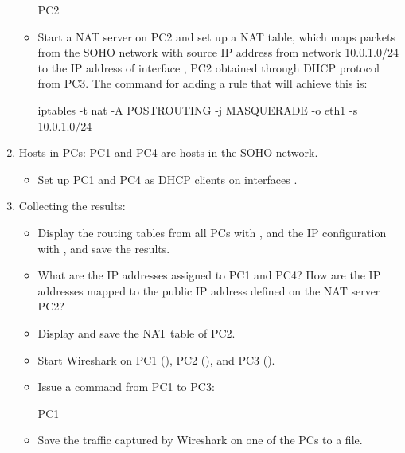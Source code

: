\begin{enumerate}
\begin{itemize}
				\begin{cmdblock}
	PC2%
				\end{cmdblock}
			\item Start a NAT server on PC2 and set up a NAT table, which maps packets from the SOHO network with source IP address from network 10.0.1.0/24 to the IP address of interface , PC2 obtained through DHCP protocol from PC3. The command for adding a rule that will achieve this is:
				\begin{cmdblock}
	iptables -t nat -A POSTROUTING -j MASQUERADE -o eth1 -s 10.0.1.0/24
				\end{cmdblock}
		\end{itemize}
	\item Hosts in PCs: PC1 and PC4 are hosts in the SOHO network.
		\begin{itemize}
			\item Set up PC1 and PC4 as DHCP clients on interfaces .
		\end{itemize}
	\item Collecting the results:
		\begin{itemize}
			\item Display the routing tables from all PCs with , and the IP configuration with , and save the results.
			\item What are the IP addresses assigned to PC1 and PC4? How are the IP addresses mapped to the public IP address defined on the NAT server PC2?
			\item Display and save the NAT table of PC2.
			\item Start Wireshark on PC1 (), PC2 (), and PC3 ().
			\item Issue a  command from PC1 to PC3:
				\begin{cmdblock}
	PC1%
				\end{cmdblock}
			\item Save the traffic captured by Wireshark on one of the PCs to a file.
		\end{itemize}
\end{enumerate}

\begin{questions}
\end{questions}
